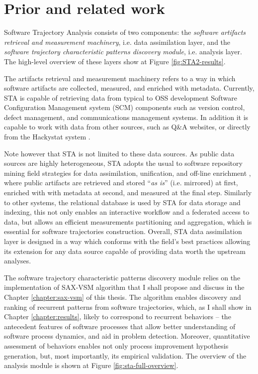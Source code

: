 \chapter{Prior and related work}\label{chapter_background_work}
Software Trajectory Analysis consists of two components: 
the \textit{software artifacts retrieval and measurement machinery}, i.e. data assimilation layer, 
and the \textit{software trajectory characteristic patterns discovery module}, i.e. analysis layer. 
The high-level overview of these layers show at Figure \ref{fig:STA2-results}.

The artifacts retrieval and measurement machinery refers to a way in which software artifacts are 
collected, measured, and enriched with metadata. 
Currently, STA is capable of retrieving data from typical to OSS development Software Configuration 
Management system (SCM) components such as version control, defect management, and communications 
management systems. In addition it is capable to work with data from other sources, such as Q\&A 
websites, or directly from the Hackystat system \cite{citeulike:557296}.

Note however that STA is not limited to these data sources.
As public data sources are highly heterogeneous, STA adopts the usual to software repository mining 
field strategies for data assimilation, unification, and off-line enrichment \cite{german04_softchange}, 
where public artifacts are retrieved and stored ``\textit{as is}'' (i.e. mirrored) at first, 
enriched with with metadata at second, and measured at the final step.
Similarly to other systems, the relational database is used by STA for data storage and indexing, 
this not only enables an interactive workflow and a federated access to data, but allows an efficient 
measurements partitioning and aggregation, which is essential for software trajectories construction.
Overall, STA data assimilation layer is designed in a way which conforms with the field's best practices
allowing its extension for any data source capable of providing data worth the upstream analyses.

The software trajectory characteristic patterns discovery module relies on the implementation of 
SAX-VSM algorithm that I shall propose and discuss in the Chapter \ref{chapter:sax-vsm} of this thesis.
The algorithm enables discovery and ranking of recurrent patterns from software trajectories, 
which, as I shall show in Chapter \ref{chapter:results}, likely to correspond to recurrent behaviors -- 
the antecedent features of software processes that allow better understanding of software process dynamics, 
and aid in problem detection. Moreover, quantitative assessment of behaviors enables not only process 
improvement hypothesis generation, but, most importantly, its empirical validation.
The overview of the analysis module is shown at Figure \ref{fig:sta-full-overview}.

